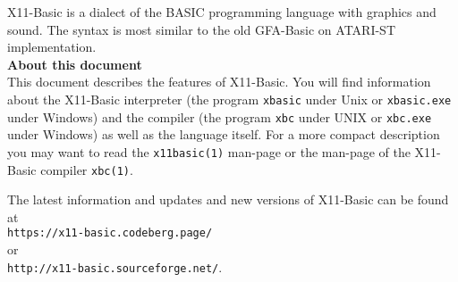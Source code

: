 X11-Basic is a dialect of the BASIC programming language with graphics and sound.
The syntax is most similar to the old GFA-Basic on ATARI-ST
implementation.\\[4ex]

{\bf About this document}\\[2ex] This document	describes the features of
X11-Basic. You will find information about the X11-Basic interpreter (the 
program \verb|xbasic| under Unix or \verb|xbasic.exe| under Windows) and the
compiler (the program \verb|xbc| under UNIX or \verb|xbc.exe| under Windows) as
well as the language itself. For a more compact description you may  want to
read the \verb|x11basic(1)| man-page or the man-page of the X11-Basic compiler
\verb|xbc(1)|.

The latest information and updates and new versions of X11-Basic can be found
at\\ 
\verb|https://x11-basic.codeberg.page/| \\
or \\
\verb|http://x11-basic.sourceforge.net/|.

